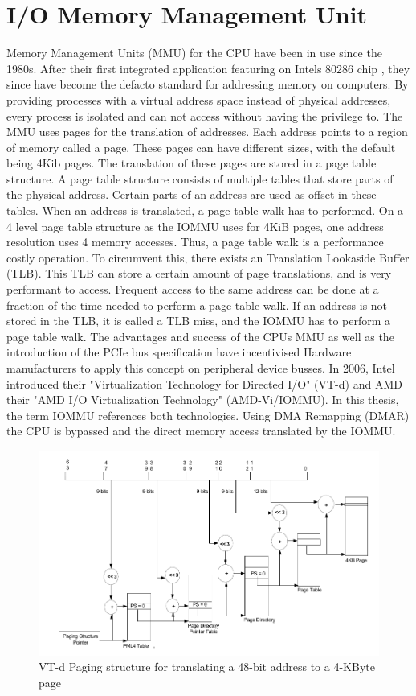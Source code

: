 \section{I/O Memory Management Unit}
Memory Management Units (MMU) for the CPU have been in use since the 1980s. After their first integrated application featuring on Intels 80286 chip \cite{intel80286}, they since have become the defacto standard for addressing memory on computers. By providing processes with a virtual address space instead of physical addresses, every process is isolated and can not access without having the privilege to. The MMU uses pages for the translation of addresses. Each address points to a region of memory called a page. These pages can have different sizes, with the default being 4Kib pages.
The translation of these pages are stored in a page table structure. A page table structure consists of multiple tables that store parts of the physical address. Certain parts of an address are used as offset in these tables. When an address is translated, a page table walk has to performed. On a 4 level page table structure as the IOMMU uses for 4KiB pages, one address resolution uses 4 memory accesses. Thus, a page table walk is a performance costly operation. To circumvent this, there exists an Translation Lookaside Buffer (TLB). This TLB can store a certain amount of page translations, and is very performant to access. Frequent access to the same address can be done at a fraction of the time needed to perform a page table walk. If an address is not stored in the TLB, it is called a TLB miss, and the IOMMU has to perform a page table walk.
The advantages and success of the CPUs MMU as well as the introduction of the PCIe bus specification have incentivised Hardware manufacturers to apply this concept on peripheral device busses. In 2006, Intel introduced their "Virtualization Technology for Directed I/O" (VT-d) and AMD their "AMD I/O Virtualization Technology" (AMD-Vi/IOMMU). In this thesis, the term IOMMU references both technologies.
Using DMA Remapping (DMAR) the CPU is bypassed and the direct memory access translated by the IOMMU.

\begin{figure}
    \centering
    \includegraphics[width=\textwidth]{figures/4kibtranslation.pdf}
    \caption{VT-d Paging structure for translating a 48-bit address to a 4-KByte page}
    \label{fig:pagewalk4kib}
\end{figure}

